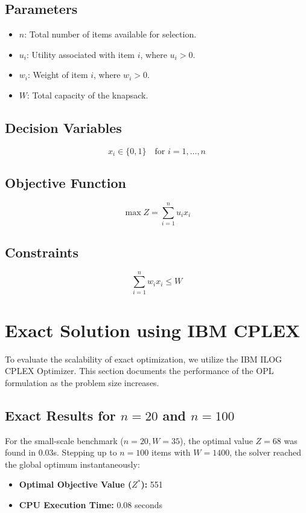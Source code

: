 \documentclass[11pt,a4paper]{article}
\begin{document}
\subsection*{Parameters}
\begin{itemize}
    \item $n$: Total number of items available for selection.
    \item $u_i$: Utility associated with item $i$, where $u_i > 0$.
    \item $w_i$: Weight of item $i$, where $w_i > 0$.
    \item $W$: Total capacity of the knapsack.
\end{itemize}

\subsection*{Decision Variables}
\begin{equation*}
    x_i \in \{0, 1\} \quad \text{for } i = 1, \dots, n
\end{equation*}

\subsection*{Objective Function}
\begin{equation*}
    \max Z = \sum_{i=1}^{n} u_i x_i
\end{equation*}

\subsection*{Constraints}
\begin{equation*}
    \sum_{i=1}^{n} w_i x_i \le W
\end{equation*}

\section{Exact Solution using IBM CPLEX}
To evaluate the scalability of exact optimization, we utilize the IBM ILOG CPLEX Optimizer. This section documents the performance of the OPL formulation as the problem size increases.

\subsection{Exact Results for $n=20$ and $n=100$}
For the small-scale benchmark ($n=20, W=35$), the optimal value $Z=68$ was found in 0.03s. Stepping up to $n=100$ items with $W=1400$, the solver reached the global optimum instantaneously:
\begin{itemize}
    \item \textbf{Optimal Objective Value ($Z^*$):} 551
    \item \textbf{CPU Execution Time:} 0.08 seconds
\end{itemize}
\end{document}
